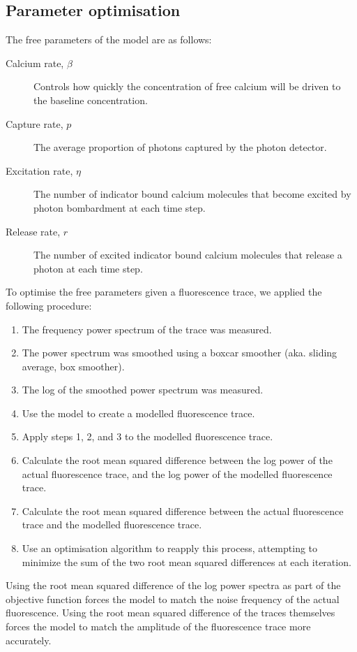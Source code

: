 \documentclass[a4paper,12pt]{article}
\theoremstyle{definition}
\begin{document}
\subsection{Parameter optimisation}\label{sec:parameter_optimisation}
The free parameters of the model are as follows:
\begin{description}
    \item[Calcium rate, $\beta$] Controls how quickly the concentration of free calcium will be driven to the baseline concentration.
    \item[Capture rate, $p$] The average proportion of photons captured by the photon detector.
    \item[Excitation rate, $\eta$] The number of indicator bound calcium molecules that become excited by photon bombardment at each time step.
    \item[Release rate, $r$] The number of excited indicator bound calcium molecules that release a photon at each time step.
\end{description}
To optimise the free parameters given a fluorescence trace, we applied the following procedure:
\begin{enumerate}
    \item The frequency power spectrum of the trace was measured.
    \item The power spectrum was smoothed using a boxcar smoother (aka. sliding average, box smoother).
    \item The log of the smoothed power spectrum was measured.
    \item Use the model to create a modelled fluorescence trace.
    \item Apply steps 1, 2, and 3 to the modelled fluorescence trace.
    \item Calculate the root mean squared difference between the log power of the actual fluorescence trace, and the log power of the modelled fluorescence trace.
    \item Calculate the root mean squared difference between the actual fluorescence trace and the modelled fluorescence trace.
    \item Use an optimisation algorithm to reapply this process, attempting to minimize the sum of the two root mean squared differences at each iteration.
\end{enumerate}
Using the root mean squared difference of the log power spectra as part of the objective function forces the model to match the noise frequency of the actual fluorescence. Using the root mean squared difference of the traces themselves forces the model to match the amplitude of the fluorescence trace more accurately.
\end{document}
